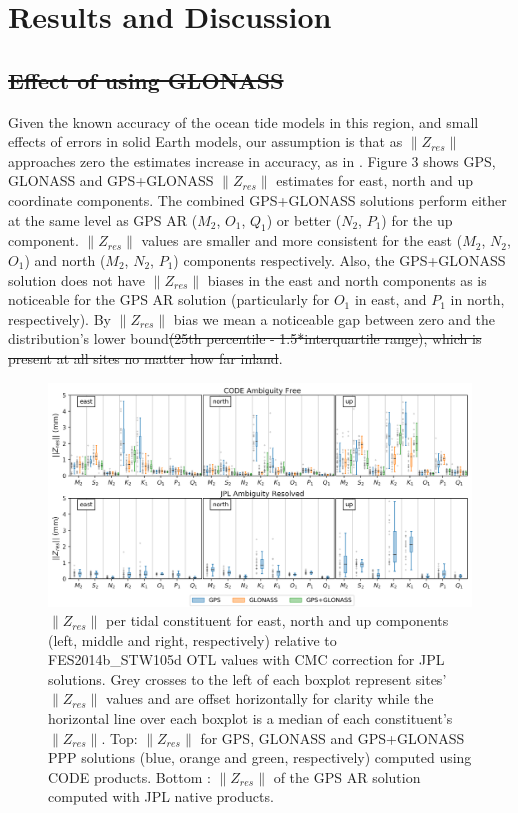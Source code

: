 \documentclass[se, manuscript]{copernicus}
\providecommand{\DIFdel}[1]{{\protect\color{red}\sout{#1}}}                      %
\providecommand{\DIFdelbegin}{} %
\providecommand{\DIFdelend}{} %
\begin{document}
\section{Results and Discussion}

\DIFdelbegin \subsection{\DIFdel{Effect of using GLONASS}}
\addtocounter{subsection}{-1}%
\DIFdelend %
Given the known accuracy of the ocean tide models in this region, and small effects of errors in solid Earth models, our assumption is that as $\|Z_{res}\|$ approaches zero the estimates increase in accuracy, as in \cite{Bos2015}. Figure 3 shows GPS, GLONASS and GPS+GLONASS $\|Z_{res}\|$ estimates for east, north and up coordinate components. The combined GPS+GLONASS solutions perform either at the same level as GPS AR ($M_2$, $O_1$, $Q_1$) or better ($N_2$, $P_1$) for the up component. $\|Z_{res}\|$ values are smaller and more consistent for the east ($M_2$, $N_2$, $O_1$) and north ($M_2$, $N_2$, $P_1$) components respectively.
Also, the GPS+GLONASS solution does not have $\|Z_{res}\|$ biases in the east and north components as is noticeable for the GPS AR solution (particularly for $O_1$ in east, and $P_1$ in north, respectively). By $\|Z_{res}\|$ bias we mean a noticeable gap between zero and the distribution’s lower bound\DIFdelbegin \DIFdel{(25th percentile - 1.5*interquartile range), which is present at all sites no matter how far inland}\DIFdelend .

\begin{figure}[t]
\includegraphics[width=17cm]{fig03.png}
\caption{$\|Z_{res}\|$ per tidal constituent for east, north and up components (left, middle and right, respectively) relative to FES2014b\_STW105d OTL values with CMC correction for JPL solutions. Grey crosses to the left of each boxplot represent sites’ $\|Z_{res}\|$ values and are offset horizontally for clarity while the horizontal line over each boxplot is a median of each constituent’s $\|Z_{res}\|$. Top: $\|Z_{res}\|$ for GPS, GLONASS and GPS+GLONASS PPP solutions (blue, orange and green, respectively) computed using CODE products. Bottom : $\|Z_{res}\|$ of the GPS AR solution computed with JPL native products.}
\end{figure}
\end{document}
